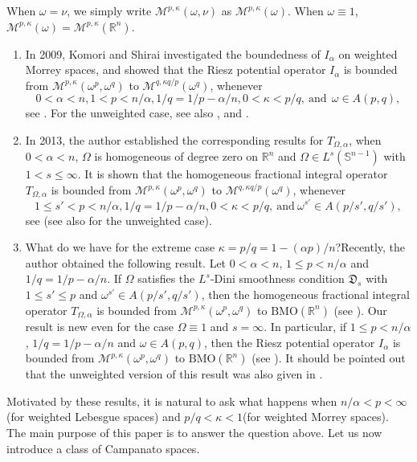 \documentclass[preprint,10pt]{elsarticle}
\numberwithin{equation}{section}
\begin{document}
When $\omega=\nu$, we simply write $\mathcal{M}^{p,\kappa}(\omega,\nu)$ as $\mathcal{M}^{p,\kappa}(\omega)$. When $\omega\equiv1$, $\mathcal{M}^{p,\kappa}(\omega)=\mathcal{M}^{p,\kappa}(\mathbb R^n)$.
\begin{enumerate}
  \item In 2009, Komori and Shirai investigated the boundedness of $I_{\alpha}$ on weighted Morrey spaces, and showed that the Riesz potential operator $I_{\alpha}$ is bounded from $\mathcal{M}^{p,\kappa}(\omega^p,\omega^q)$ to $\mathcal{M}^{q,{\kappa q}/p}(\omega^q)$, whenever
      \begin{equation*}
      0<\alpha<n,1<p<n/{\alpha},1/q=1/p-{\alpha}/n,0<\kappa<p/q, ~\mbox{and} ~~\omega\in A(p,q),
      \end{equation*}
      see \cite[Theorem 3.6]{komori}. For the unweighted case, see also \cite{adams}, \cite{adams1} and \cite{wang3}.
  \item In 2013, the author established the corresponding results for $T_{\Omega,\alpha}$, when $0<\alpha<n$, $\Omega$ is homogeneous of degree zero on $\mathbb R^n$ and $\Omega\in L^s(\mathbb{S}^{n-1})$ with $1<s\leq\infty$. It is shown that the homogeneous fractional integral operator $T_{\Omega,\alpha}$ is bounded from $\mathcal{M}^{p,\kappa}(\omega^p,\omega^q)$ to $\mathcal{M}^{q,{\kappa q}/p}(\omega^q)$, whenever
  \begin{equation*}
  1\leq s'<p<n/{\alpha},1/q=1/p-{\alpha}/n,0<\kappa<p/q,~\mbox{and} ~\omega^{s'}\in A(p/{s'},q/{s'}),
  \end{equation*}
  see \cite[Theorem 1.2]{wang}(see also \cite{lu2} for the unweighted case).
  \item What do we have for the extreme case $\kappa=p/q=1-{(\alpha p)}/n$?Recently, the author obtained the following result. Let $0<\alpha<n$, $1\leq p<n/{\alpha}$ and $1/q=1/p-{\alpha}/n$. If $\Omega$ satisfies the $L^s$-Dini smoothness condition $\mathfrak{D}_{s}$ with $1\leq s'\leq p$ and $\omega^{s'}\in A(p/{s'},q/{s'})$, then the homogeneous fractional integral operator $T_{\Omega,\alpha}$ is bounded from $\mathcal{M}^{p,\kappa}(\omega^p,\omega^q)$ to $\mathrm{BMO}(\mathbb R^n)$ (see \cite[Theorem 2.2]{wang2}). Our result is new even for the case $\Omega\equiv1$ and $s=\infty$. In particular, if $1\leq p<n/{\alpha}$, $1/q=1/p-{\alpha}/n$ and $\omega\in A(p,q)$, then the Riesz potential operator $I_{\alpha}$ is bounded from $\mathcal{M}^{p,\kappa}(\omega^p,\omega^q)$ to $\mathrm{BMO}(\mathbb R^n)$ (see \cite[Corollary 2.3]{wang2}). It should be pointed out that the unweighted version of this result was also given in \cite{meng}.
\end{enumerate}
Motivated by these results, it is natural to ask what happens when $n/{\alpha}<p<\infty$(for weighted Lebesgue spaces) and $p/q<\kappa<1$(for weighted Morrey spaces). The main purpose of this paper is to answer the question above. Let us now introduce a class of Campanato spaces.
\end{document}
